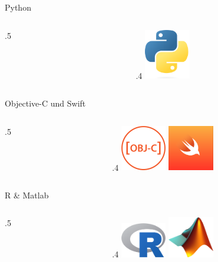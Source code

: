 \begin{frame}{Python}
    \begin{columns}
        \begin{column}{.5\framewidth}

        \end{column}
        \begin{column}{.4\framewidth}
            \includegraphics[width=2cm]{resources/logos/python}
        \end{column}
    \end{columns}
\end{frame}
\begin{frame}{Objective-C und Swift}
    \begin{columns}
        \begin{column}{.5\framewidth}

        \end{column}
        \begin{column}{.4\framewidth}
            \includegraphics[width=2cm]{resources/logos/objective-c.png}
            \includegraphics[width=2cm]{resources/logos/swift.png}
        \end{column}
    \end{columns}
\end{frame}
\begin{frame}{R \& Matlab}
    \begin{columns}
        \begin{column}{.5\framewidth}

        \end{column}
        \begin{column}{.4\framewidth}
            \includegraphics[width=2cm]{resources/logos/r.png}
            \includegraphics[width=2cm]{resources/logos/matlab.png}
        \end{column}
    \end{columns}
\end{frame}
